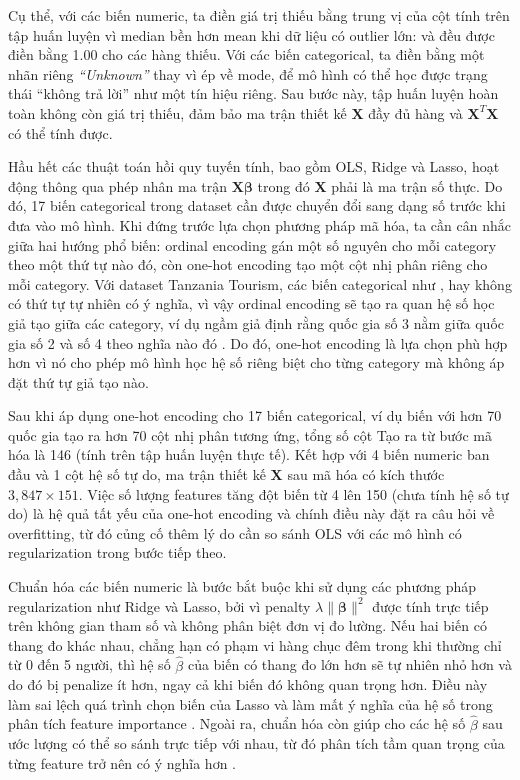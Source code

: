 Cụ thể, với các biến numeric, ta điền giá trị thiếu bằng trung vị của cột tính trên tập huấn luyện vì median bền hơn mean khi dữ liệu có outlier lớn:  và  đều được điền bằng 1.00 cho các hàng thiếu. Với các biến categorical, ta điền bằng một nhãn riêng \textit{``Unknown''} thay vì ép về mode, để mô hình có thể học được trạng thái ``không trả lời'' như một tín hiệu riêng. Sau bước này, tập huấn luyện hoàn toàn không còn giá trị thiếu, đảm bảo ma trận thiết kế $\mathbf{X}$ đầy đủ hàng và $\mathbf{X}^T\mathbf{X}$ có thể tính được.


Hầu hết các thuật toán hồi quy tuyến tính, bao gồm OLS, Ridge và Lasso, hoạt động thông qua phép nhân ma trận $\mathbf{X}\boldsymbol{\beta}$ trong đó $\mathbf{X}$ phải là ma trận số thực. Do đó, 17 biến categorical trong dataset cần được chuyển đổi sang dạng số trước khi đưa vào mô hình. Khi đứng trước lựa chọn phương pháp mã hóa, ta cần cân nhắc giữa hai hướng phổ biến: ordinal encoding gán một số nguyên cho mỗi category theo một thứ tự nào đó, còn one-hot encoding tạo một cột nhị phân riêng cho mỗi category. Với dataset Tanzania Tourism, các biến categorical như ,  hay  không có thứ tự tự nhiên có ý nghĩa, vì vậy ordinal encoding sẽ tạo ra quan hệ số học giả tạo giữa các category, ví dụ ngầm giả định rằng quốc gia số 3 nằm giữa quốc gia số 2 và số 4 theo nghĩa nào đó \cite{james2013}. Do đó, one-hot encoding là lựa chọn phù hợp hơn vì nó cho phép mô hình học hệ số riêng biệt cho từng category mà không áp đặt thứ tự giả tạo nào.

Sau khi áp dụng one-hot encoding cho 17 biến categorical, ví dụ biến  với hơn 70 quốc gia tạo ra hơn 70 cột nhị phân tương ứng, tổng số cột Tạo ra từ bước mã hóa là 146 (tính trên tập huấn luyện thực tế). Kết hợp với 4 biến numeric ban đầu và 1 cột hệ số tự do, ma trận thiết kế $\mathbf{X}$ sau mã hóa có kích thước $3{,}847 \times 151$. Việc số lượng features tăng đột biến từ 4 lên 150 (chưa tính hệ số tự do) là hệ quả tất yếu của one-hot encoding và chính điều này đặt ra câu hỏi về overfitting, từ đó củng cố thêm lý do cần so sánh OLS với các mô hình có regularization trong bước tiếp theo.


Chuẩn hóa các biến numeric là bước bắt buộc khi sử dụng các phương pháp regularization như Ridge và Lasso, bởi vì penalty $\lambda\|\boldsymbol{\beta}\|^2$ được tính trực tiếp trên không gian tham số và không phân biệt đơn vị đo lường. Nếu hai biến có thang đo khác nhau, chẳng hạn  có phạm vi hàng chục đêm trong khi  thường chỉ từ 0 đến 5 người, thì hệ số $\hat{\beta}$ của biến có thang đo lớn hơn sẽ tự nhiên nhỏ hơn và do đó bị penalize ít hơn, ngay cả khi biến đó không quan trọng hơn. Điều này làm sai lệch quá trình chọn biến của Lasso và làm mất ý nghĩa của hệ số trong phân tích feature importance \cite{hoerl1970}. Ngoài ra, chuẩn hóa còn giúp cho các hệ số $\hat{\beta}$ sau ước lượng có thể so sánh trực tiếp với nhau, từ đó phân tích tầm quan trọng của từng feature trở nên có ý nghĩa hơn \cite{james2013}.

